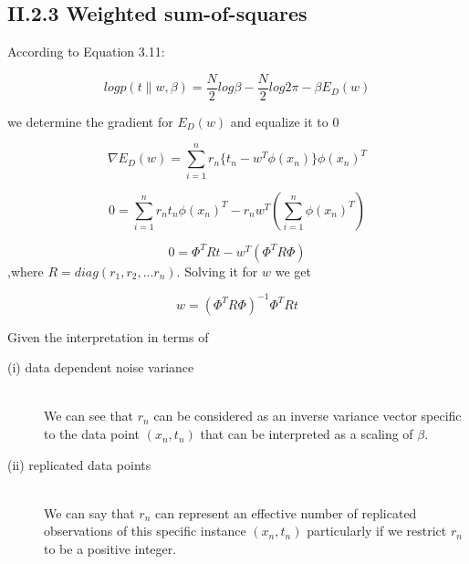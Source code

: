 \documentclass{article}      %
\begin{document}
\subsection*{II.2.3 Weighted sum-of-squares}

According to Equation 3.11:

\[
log p(t \| w, \beta) = \frac{N}{2}log\beta - \frac{N}{2}log 2\pi - \beta E_D(w) 
\]

we determine the gradient for $E_D(w)$ and equalize it to $0$

\[
\nabla E_D(w) =  \sum_{i=1}^{n} r_n\{t_n - w^T \phi(x_n)\}\phi(x_n)^T
\]

\[
0 =  \sum_{i=1}^{n} r_nt_n\phi(x_n)^T - r_nw^T(\sum_{i=1}^{n} \phi(x_n)^T)
\]

\[
0 = \Phi^TRt - w^T(\Phi^TR\Phi)
\]
,where $R = diag(r_1, r_2, ... r_n)$. Solving it for $w$ we get 

\[
 w = (\Phi^TR\Phi)^{-1}\Phi^TRt
\]

Given the interpretation in terms of 

\begin{description}
   \item [(i) data dependent noise variance]\hfill \\
   We can see that $r_n$ can be considered as an inverse variance vector specific to the data point $(x_n, t_n)$ that can be interpreted as a scaling of $\beta$.
   \item [(ii) replicated data points]\hfill \\
   We can say that $r_n$ can represent an effective number of replicated observations of this specific instance $(x_n, t_n)$ particularly if we restrict $r_n$ to be a positive integer.
\end{description}
\end{document}
